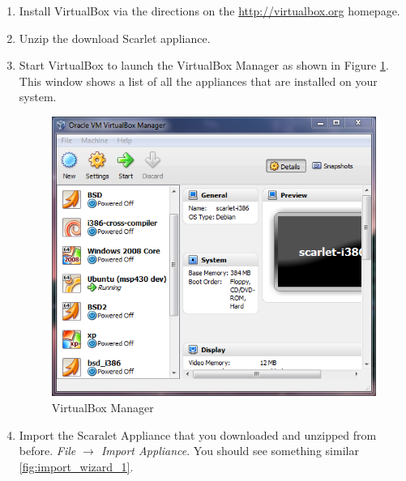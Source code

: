 \documentclass[pdftex,11pt,letterpaper]{article}
\begin{document}
\begin{enumerate}
  \item Install VirtualBox via the directions on the \url{http://virtualbox.org} homepage.
\item Unzip the download Scarlet appliance.
\item Start VirtualBox to launch the VirtualBox Manager as shown in Figure \ref{fig:virtualbox_manager}.  This window shows a list of all the appliances that are installed on your system.

  \begin{figure}[H]
    \begin{center}
      \leavevmode
      \includegraphics[]{scarlet_images/virtual_box.png}
    \end{center}
    \caption{VirtualBox Manager}
    \label{fig:virtualbox_manager}
  \end{figure}

\item Import the Scaralet Appliance that you downloaded and unzipped from before.  \textit{File $\rightarrow$ Import Appliance}.  You should see something similar \ref{fig:import_wizard_1}.


\end{enumerate}
\end{document}
